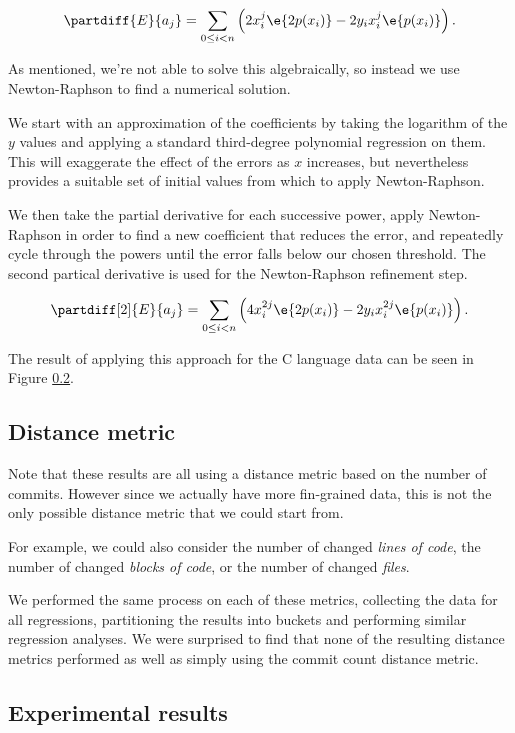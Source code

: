 \documentclass[10pt,journal,compsoc]{IEEEtran}
\begin{document}
$$
\partdiff{E}{a_j} = \sum_{0 \le i < n} \left( 2 x_i^j \e{2 p(x_i)} - 2 y_i x_i^j \e{p(x_i)} \right) .
$$

As mentioned, we're not able to solve this algebraically, so instead we use Newton-Raphson to find a numerical solution.


We start with an approximation of the coefficients by taking the logarithm of the $y$ values and applying a standard third-degree polynomial regression on them. This will exaggerate the effect of the errors as $x$ increases, but nevertheless provides a suitable set of initial values from which to apply Newton-Raphson.

We then take the partial derivative for each successive power, apply Newton-Raphson in order to find a new coefficient that reduces the error, and repeatedly cycle through the powers until the error falls below our chosen threshold. The second partical derivative is used for the Newton-Raphson refinement step.

$$
\partdiff[2]{E}{a_j} = \sum_{0 \le i < n} \left( 4 x_i^{2j} \e{2 p(x_i)} - 2 y_i x_i^{2j} \e{p(x_i)} \right) .
$$

The result of applying this approach for the C language data can be seen in Figure \ref{}.

\subsection{Distance metric}

Note that these results are all using a distance metric based on the number of commits. However since we actually have more fin-grained data, this is not the only possible distance metric that we could start from.

For example, we could also consider the number of changed {\it lines of code}, the number of changed {\it blocks of code}, or the number of changed {\it files}.

We performed the same process on each of these metrics, collecting the data for all regressions, partitioning the results into buckets and performing similar regression analyses. We were surprised to find that none of the resulting distance metrics performed as well as simply using the commit count distance metric.

\subsection{Experimental results}
\end{document}
